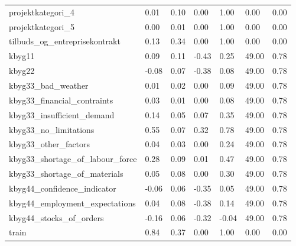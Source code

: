 \begin{landscape}
\begin{longtable}[h!]{lllllll}
projektkategori_4 & 0.01 & 0.10 & 0.00 & 1.00 & 0.00 & 0.00 \\
projektkategori_5 & 0.00 & 0.01 & 0.00 & 1.00 & 0.00 & 0.00 \\
tilbuds_og_entreprisekontrakt & 0.13 & 0.34 & 0.00 & 1.00 & 0.00 & 0.00 \\
kbyg11 & 0.09 & 0.11 & -0.43 & 0.25 & 49.00 & 0.78 \\
kbyg22 & -0.08 & 0.07 & -0.38 & 0.08 & 49.00 & 0.78 \\
kbyg33_bad_weather & 0.01 & 0.02 & 0.00 & 0.09 & 49.00 & 0.78 \\
kbyg33_financial_contraints & 0.03 & 0.01 & 0.00 & 0.08 & 49.00 & 0.78 \\
kbyg33_insufficient_demand & 0.14 & 0.05 & 0.07 & 0.35 & 49.00 & 0.78 \\
kbyg33_no_limitations & 0.55 & 0.07 & 0.32 & 0.78 & 49.00 & 0.78 \\
kbyg33_other_factors & 0.04 & 0.03 & 0.00 & 0.24 & 49.00 & 0.78 \\
kbyg33_shortage_of_labour_force & 0.28 & 0.09 & 0.01 & 0.47 & 49.00 & 0.78 \\
kbyg33_shortage_of_materials & 0.05 & 0.08 & 0.00 & 0.30 & 49.00 & 0.78 \\
kbyg44_confidence_indicator & -0.06 & 0.06 & -0.35 & 0.05 & 49.00 & 0.78 \\
kbyg44_employment_expectations & 0.04 & 0.08 & -0.38 & 0.14 & 49.00 & 0.78 \\
kbyg44_stocks_of_orders & -0.16 & 0.06 & -0.32 & -0.04 & 49.00 & 0.78 \\
train & 0.84 & 0.37 & 0.00 & 1.00 & 0.00 & 0.00 \\
\end{longtable}\end{landscape}
